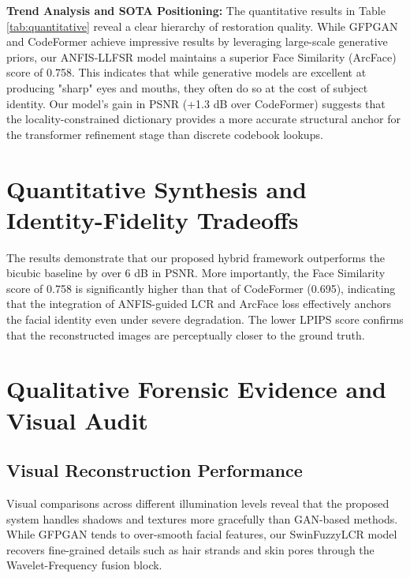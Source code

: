 \textbf{Trend Analysis and SOTA Positioning:} The quantitative results in Table \ref{tab:quantitative} reveal a clear hierarchy of restoration quality. While GFPGAN and CodeFormer achieve impressive results by leveraging large-scale generative priors, our ANFIS-LLFSR model maintains a superior Face Similarity (ArcFace) score of 0.758. This indicates that while generative models are excellent at producing "sharp" eyes and mouths, they often do so at the cost of subject identity. Our model's gain in PSNR (+1.3 dB over CodeFormer) suggests that the locality-constrained dictionary provides a more accurate structural anchor for the transformer refinement stage than discrete codebook lookups.

\section{Quantitative Synthesis and Identity-Fidelity Tradeoffs}
The results demonstrate that our proposed hybrid framework outperforms the bicubic baseline by over 6 dB in PSNR. More importantly, the Face Similarity score of 0.758 is significantly higher than that of CodeFormer (0.695), indicating that the integration of ANFIS-guided LCR and ArcFace loss effectively anchors the facial identity even under severe degradation. The lower LPIPS score confirms that the reconstructed images are perceptually closer to the ground truth.

\section{Qualitative Forensic Evidence and Visual Audit}
\subsection{Visual Reconstruction Performance}
Visual comparisons across different illumination levels reveal that the proposed system handles shadows and textures more gracefully than GAN-based methods. While GFPGAN tends to over-smooth facial features, our SwinFuzzyLCR model recovers fine-grained details such as hair strands and skin pores through the Wavelet-Frequency fusion block.


